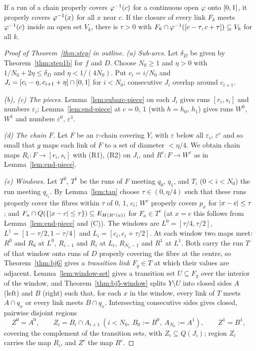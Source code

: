 
\begin{lemma}\label{lem:tau}
If a run of a chain properly covers $\varphi^{-1}(c)$ for a continuous open $\varphi$ onto $[0,1]$, it properly covers $\varphi^{-1}(x)$ for all $x$ near $c$. If the closure of
every link $F_k$ meets $\varphi^{-1}(c)$ inside an open set $V_k$, there is $\tau>0$ with $F_k\cap\varphi^{-1}([c-\tau,c+\tau])\subseteq V_k$ for all $k$.
\end{lemma}


\begin{proof}[Proof of Theorem~\ref{thm:step} in outline]
\emph{(a) Sub-arcs.} Let $\delta_D$ be given by Theorem~\ref{thm:step1b} for $f$ and $D$. Choose $N_0\ge1$ and $\eta>0$ with $1/N_0+2\eta\le\delta_D$ and $\eta<1/(4N_0)$. Put
$c_i=i/N_0$ and $J_i=[c_i-\eta,c_{i+1}+\eta]\cap[0,1]$ for $i<N_0$; consecutive $J_i$ overlap around $c_{i+1}$.

\emph{(b), (c) The pieces.} Lemma~\ref{lem:subarc-piece} on each $J_i$ gives runs $[r_i,s_i]$ and numbers $\varepsilon_i$; Lemma~\ref{lem:end-piece} at $c=0$, $1$ (with $h=h_0$,
$h_1$) gives runs $W^0$, $W^1$ and numbers $\varepsilon^0$, $\varepsilon^1$.

\emph{(d) The chain $F$.} Let $F$ be an $\varepsilon$-chain covering $Y$, with $\varepsilon$ below all $\varepsilon_i$, $\varepsilon^c$ and so small that $g$ maps each link of $F$
to a set of diameter $<\eta/4$. We obtain chain maps $R_i\colon F\to[r_i,s_i]$ with (R1), (R2) on $J_i$, and $R^c\colon F\to W^c$ as in Lemma~\ref{lem:end-piece}.

\emph{(e) Windows.} Let $T^0$, $T^1$ be the runs of $F$ meeting $q_0$, $q_1$, and $T_i$ ($0<i<N_0$) the run meeting $q_{c_i}$. By Lemma~\ref{lem:tau} choose $\tau\in(0,\eta/4)$ such
that these runs properly cover the fibres within $\tau$ of $0$, $1$, $c_i$; $W^c$ properly covers $p_x$ for $\left\lvert x-c\right\rvert\le\tau$; and $F_a\cap Q(\left\{ \left\lvert x-c\right\rvert\le\tau \right\})\subseteq
E_{H(R^c(a))}$ for $F_a\in T^c$ (at $x=c$ this follows from Lemma~\ref{lem:end-piece} and (C)). The windows are $L^0=[\tau/4,\tau/2]$, $L^1=[1-\tau/2,1-\tau/4]$ and
$L_i=[c_i,c_i+\tau/2]$. At each window two maps meet: $R^0$ and $R_0$ at $L^0$, $R_{i-1}$ and $R_i$ at $L_i$, $R_{N_0-1}$ and $R^1$ at $L^1$. Both carry the run $T$ of
that window onto runs of $D$ properly covering the fibre at the centre, so Theorem~\ref{thm:bj6} gives a \emph{transition link} $F_y\in T$ at which their values are adjacent.
Lemma~\ref{lem:window-set} gives a transition set $U\subseteq F_y$ over the interior of the window, and Theorem~\ref{thm:bj5-window} splits $Y\setminus U$ into closed sides
$A$ (left) and $B$ (right) such that, for each $x$ in the window, every link of $T$ meets $A\cap q_x$ or every link meets $B\cap q_x$. Intersecting consecutive sides gives
closed, pairwise disjoint regions
\[
Z^0=A^0,\qquad Z_i=B_i\cap A_{i+1}\ (i<N_0,\ B_0:=B^0,\ A_{N_0}:=A^1),\qquad Z^1=B^1,
\]
covering the complement of the transition sets, with $Z_i\subseteq Q(J_i)$; region $Z_i$ carries the map $R_i$, and $Z^c$ the map $R^c$.


\end{proof}
